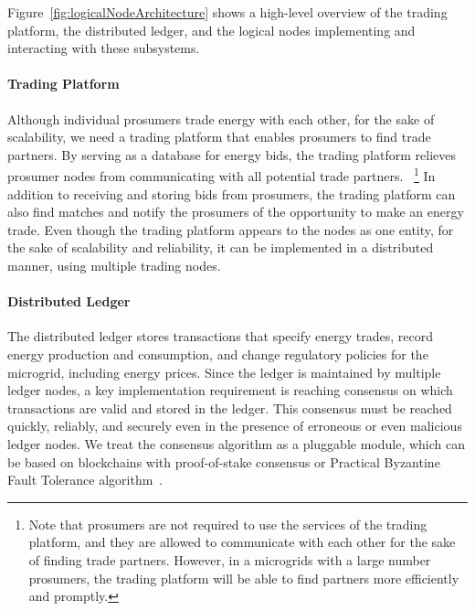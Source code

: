 \documentclass[sigconf]{acmart}
\begin{document}
Figure~\ref{fig:logicalNodeArchitecture} shows a high-level overview of the trading platform, the distributed ledger, and the logical nodes implementing and interacting with these subsystems.

\paragraph{Trading Platform}
Although individual prosumers trade energy with each other, for the sake of scalability, we need a trading platform that enables prosumers to find trade partners.
By serving as a database for energy bids, the trading platform relieves prosumer nodes from communicating with all potential trade partners.~%
\footnote{Note that prosumers are not required to use the services of the trading platform, and they are allowed to communicate with each other for the sake of finding trade partners.
However, in a microgrids with a large number prosumers, the trading platform will be able to find partners more efficiently and promptly.}
In addition to receiving and storing bids from prosumers, the trading platform can also find matches and notify the prosumers of the opportunity to make an energy trade.
Even though the trading platform appears to the nodes as one entity, for the sake of scalability and reliability, it can be implemented in a distributed manner, using multiple trading nodes.

\paragraph{Distributed Ledger}
The distributed ledger stores transactions that specify energy trades, record energy production and consumption, and change regulatory policies for the microgrid, including energy prices.
Since the ledger is maintained by multiple ledger nodes, a key implementation requirement is reaching consensus on which transactions are valid and stored in the ledger.
This consensus must be reached quickly, reliably, and securely even in the presence of erroneous or even malicious ledger nodes.
We treat the consensus algorithm as a pluggable module, which can be based on blockchains with proof-of-stake consensus or Practical Byzantine Fault Tolerance algorithm~\cite{castro1999practical}.
\end{document}

